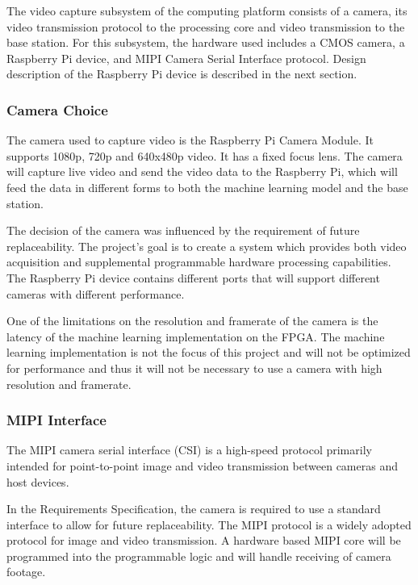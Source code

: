 
The video capture subsystem of the computing platform consists of a camera, its video transmission protocol to the processing core and video transmission to the base station. For this subsystem, the hardware used includes a CMOS camera, a Raspberry Pi device, and MIPI Camera Serial Interface protocol. Design description of the Raspberry Pi device is described in the next section.

\subsubsection{Camera Choice}
The camera used to capture video is the Raspberry Pi Camera Module. It supports 1080p, 720p and 640x480p video. It has a fixed focus lens. The camera will capture live video and send the video data to the Raspberry Pi, which will feed the data in different forms to both the machine learning model and the base station.

The decision of the camera was influenced by the requirement of future replaceability. The project's goal is to create a system which provides both video acquisition and supplemental programmable hardware processing capabilities. The Raspberry Pi device contains different ports that will support different cameras with different performance.

One of the limitations on the resolution and framerate of the camera is the latency of the machine learning implementation on the FPGA. The machine learning implementation is not the focus of this project and will not be optimized for performance and thus it will not be necessary to use a camera with high resolution and framerate.

\subsubsection{MIPI Interface}
The MIPI camera serial interface (CSI) is a high-speed protocol primarily intended for point-to-point image and video transmission between cameras and host devices. 

In the Requirements Specification, the camera is required to use a standard interface to allow for future replaceability. The MIPI protocol is a widely adopted protocol for image and video transmission. A hardware based MIPI core will be programmed into the programmable logic and will handle receiving of camera footage.

